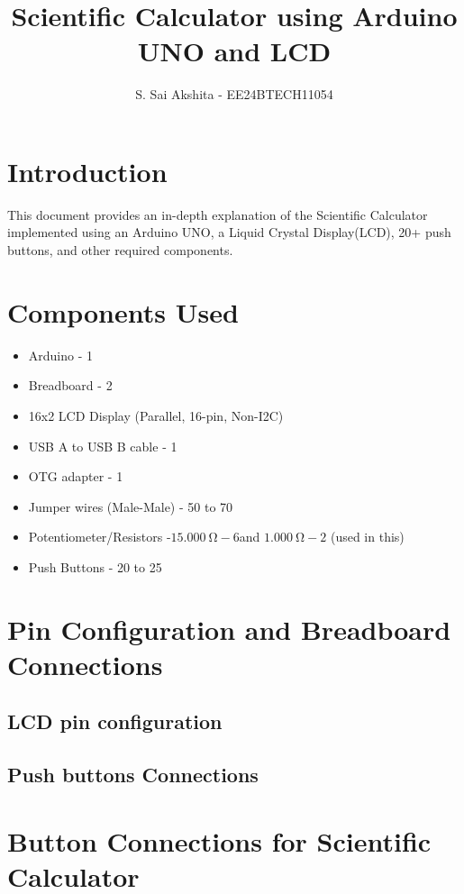 \documentclass[a4paper,12pt]{article}
\title{Scientific Calculator using Arduino UNO and LCD}
\author{S. Sai Akshita - EE24BTECH11054}
\theoremstyle{remark}
\begin{document}
\maketitle

\renewcommand{\thefigure}{\theenumi}
\renewcommand{\thetable}{\theenumi}



\section{Introduction}
This document provides an in-depth explanation of the Scientific Calculator implemented using an Arduino UNO, a Liquid Crystal Display(LCD), 20+ push buttons, and other required components.

\section{Components Used}

\begin{itemize}
    \item Arduino - 1  
    \item Breadboard - 2  
    \item 16x2 LCD Display (Parallel, 16-pin, Non-I2C)
    \item USB A to USB B cable - 1  
    \item OTG adapter - 1  
    \item Jumper wires (Male-Male) - 50 to 70  
    \item Potentiometer/Resistors -$\SI{15,000}{\ohm} - 6  $and $\SI{1,000}{\ohm} - 2$ (used in this) 
    \item Push Buttons - 20 to 25  
\end{itemize}
\newpage
\section{Pin Configuration and Breadboard Connections}

\subsection{LCD pin configuration}





\subsection{Push buttons Connections}
\section{Button Connections for Scientific Calculator}
\end{document}
